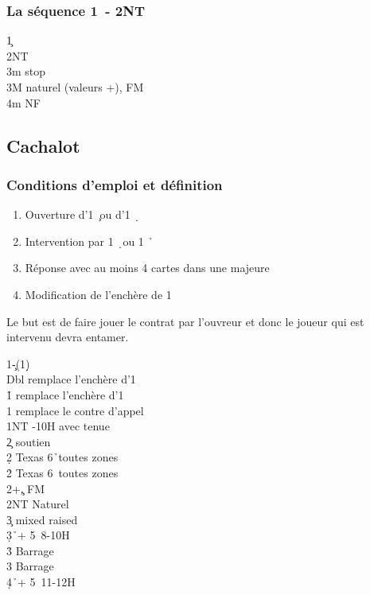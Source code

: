 \documentclass[a4paper]{article}
\begin{document}
\subsubsection{La séquence 1\pdfc\ - 2NT}

\begin{bidtable}
1\c\+\\
2NT\+\\
3m \> stop\\
3M \> naturel (valeurs +), FM\\
4m \> NF\-\-
\end{bidtable}

\subsection{Cachalot}

\subsubsection{Conditions d'emploi et définition}

\begin{enumerate}
\item Ouverture d’1 \c\ ou d’1 \d\ 

\item Intervention par 1 \d\ ou 1 \h\ 

\item Réponse avec au moins 4 cartes dans une majeure

\item Modification de l’enchère de 1 \s 

\end{enumerate}

Le but est de faire jouer le contrat par l’ouvreur et donc le joueur 
qui est intervenu devra entamer.

\begin{bidtable}
1\c-(1\d)\\
Dbl \> remplace l'enchère d'1\h \\
1\h \> remplace l'enchère d'1\s \\
1\s \> remplace le contre d'appel\\
1NT -10H avec tenue\\
2\c \> soutien \c \\
2\d \> Texas 6\h\ toutes zones\\
2\h \> Texas 6\s\ toutes zones\\
2\s {}+\c , FM\\
2NT \> Naturel\\
3\c \> mixed raised \c \\
3\d {}\h\ + 5\s\ 8-10H\\
3\h \> Barrage \h \\
3\s \> Barrage \s \\
4\d {}\h\ + 5\s\ 11-12H
\end{bidtable}
\end{document}
